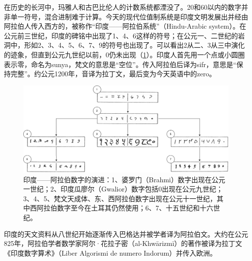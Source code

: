 \documentclass[b5paper]{ctexart}
\begin{document}
在历史的长河中，玛雅人和古巴比伦人的计数系统都湮没了。20和60以内的数字并非单一符号，混合进制难于计算。今天的现代位值制系统是印度文明发展出并经由阿拉伯人传入西方的，被称作“印度——阿拉伯系统”（Hindu-Arabic system）。在公元前三世纪，印度的碑铭中出现了1、4、6这样的符号；在公元一、二世纪的岩洞中，形如2、3、4、5、6、7、9的符号也出现了。可以看出2从二、3从三中演化的迹象，但直到公元九世纪以前，0仍未出现（\cref{fig:hindu-arabic-numerals}）。印度人首先用一个点或小圆圈表示零，命名为sunya，梵文的意思是“空位”。传入阿拉伯后译为sifr，意思是“保持完整”。约公元1200年，音译为拉丁文，最后变为今天英语中的zero。

\begin{figure}[htbp]
 \centering
 \includegraphics[scale=0.3]{img/Hindu-arabic-num}
 \caption{印度——阿拉伯数字的演进：1、婆罗门（Brahmi）数字出现在公元一世纪；2、印度瓜廖尔（Gwalior）数字包括0出现在公元九世纪；3、4、5、梵文天成体、东、西阿拉伯数字出现在公元十一世纪，其中西阿拉伯数字至今在土耳其仍然使用；6、7、十五世纪和十六世纪。}
 \label{fig:hindu-arabic-numerals}
\end{figure}

印度的天文资料从八世纪开始逐渐传入巴格达并被学者译为阿拉伯文。大约在公元825年，阿拉伯学者数学家阿尔·花拉子密（al-Khwārizmī）的著作被译为拉丁文《印度数字算术》（Liber Algorismi de numero Indorum）并传入欧洲。
\end{document}
